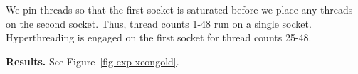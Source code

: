 We pin threads so that the first socket is saturated before we place any threads on the second socket.
Thus, thread counts 1-48 run on a single socket.
Hyperthreading is engaged on the first socket for thread counts 25-48.


\vspace{1mm}\noindent\textbf{Results.}
See Figure~\ref{fig-exp-xeongold}.